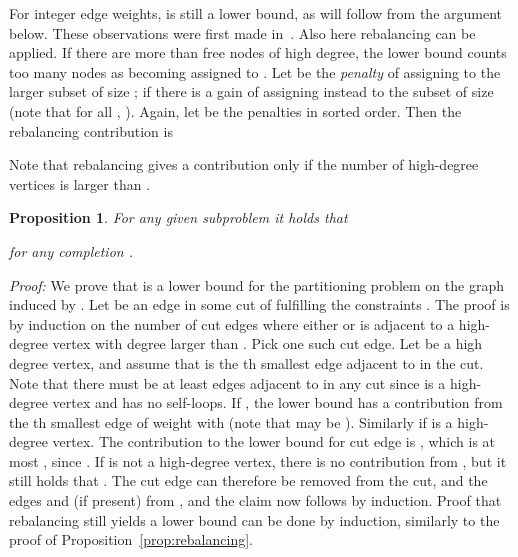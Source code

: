 \documentclass[a4paper,11pt]{article}
\newtheorem{proposition}{Proposition}
\newenvironment{proof}{\emph{Proof:}}{\newline}
\begin{document}
For integer edge weights,  is still a
lower bound, as will follow from the argument below.  These
observations were first made in~\cite{Traff96:slb}. Also here
rebalancing can be applied. If there are more than  free nodes of
high degree, the lower bound counts too many nodes as becoming
assigned to . Let  be the
\emph{penalty} of assigning  to the larger subset of size ; if
 there is a gain of assigning  instead to the subset
of size  (note that for all , ). Again, let
 be the penalties in sorted order. Then the rebalancing
contribution is

Note that rebalancing gives a contribution only if the number of
high-degree vertices is larger than .

\begin{proposition}
\label{prop:highdegree}
For any given subproblem  it holds that

for any completion .
\end{proposition}

\begin{proof}
  We prove that  is a lower bound for the partitioning
  problem on the graph  induced by . Let  be an edge in
  some cut  of  fulfilling the constraints . The proof is by induction on the number of cut edges 
  where either  or  is adjacent to a high-degree vertex with
  degree larger than . Pick one such cut edge. Let  be a
  high degree vertex, and assume that  is the th smallest
  edge adjacent to  in the cut. Note that there must be at least
   edges adjacent to  in any cut since  is a
  high-degree vertex and  has no self-loops.  If ,
  the lower bound has a contribution from the th smallest edge
   of weight  with  (note that
   may be ). Similarly if  is a high-degree vertex. The
  contribution to the lower bound for cut edge  is
  , which is at most , since
  . If  is not a high-degree vertex,
  there is no contribution from , but it still holds that
  . The cut edge  can therefore be
  removed from the cut, and the edges  and  (if
  present) from , and the claim now follows by induction. Proof
  that rebalancing still yields a lower bound can be done by
  induction, similarly to the proof of
  Proposition~\ref{prop:rebalancing}.
\end{proof}
\end{document}
